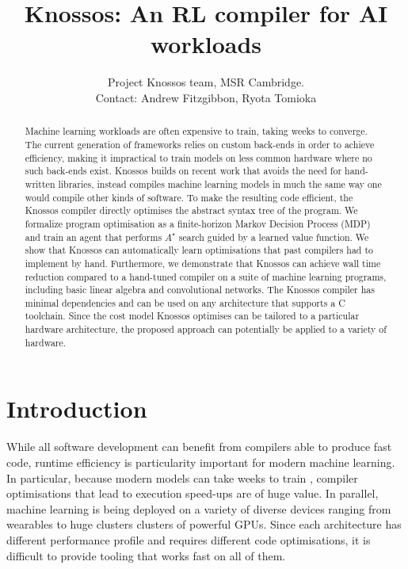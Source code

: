\documentclass[fullpage,twocolumn]{article} %
\title{Knossos: An RL compiler for AI workloads}
\author{Project Knossos team, MSR Cambridge.\\Contact: Andrew Fitzgibbon, Ryota Tomioka}
\def\Cpp{{C\nolinebreak[4]\hspace{-.05em}\raisebox{.4ex}{\tiny\bf ++}} }
\begin{document}
\maketitle

\begin{abstract}
Machine learning workloads are often expensive to train, taking weeks to converge. The current generation of frameworks relies on custom back-ends in order to achieve efficiency, making it impractical to train models on less common hardware where no such back-ends exist. Knossos builds on recent work that avoids the need for hand-written libraries, instead compiles machine learning models in much the same way one would compile other kinds of software. To make the resulting code efficient, the Knossos compiler directly optimises the abstract syntax tree of the program. We formalize program optimisation as a finite-horizon Markov Decision Process (MDP) and train an agent that performs $A^\star$ search guided by a learned value function. We show that Knossos can automatically learn optimisations that past compilers had to implement by hand. Furthermore, we demonstrate that Knossos can achieve wall time reduction compared to a hand-tuned compiler on a suite of machine learning programs, including basic linear algebra and convolutional networks.
The Knossos compiler has minimal dependencies and can be used on any architecture that supports a \Cpp toolchain. 
Since the cost model Knossos optimises can be tailored to a particular hardware architecture, the proposed approach can potentially be applied to a variety of hardware.
\end{abstract}





\section{Introduction}
While all software development can benefit from compilers able to produce fast code, runtime efficiency is particularity important for modern machine learning. In particular, because modern models can take weeks to train \citep{ai-and-compute}, compiler optimisations that lead to execution speed-ups are of huge value. In parallel, machine learning is being deployed on a variety of diverse devices ranging from wearables to huge clusters clusters of powerful GPUs. Since each architecture has different performance profile and requires different code optimisations, it is difficult to provide tooling that works fast on all of them.
\end{document}
